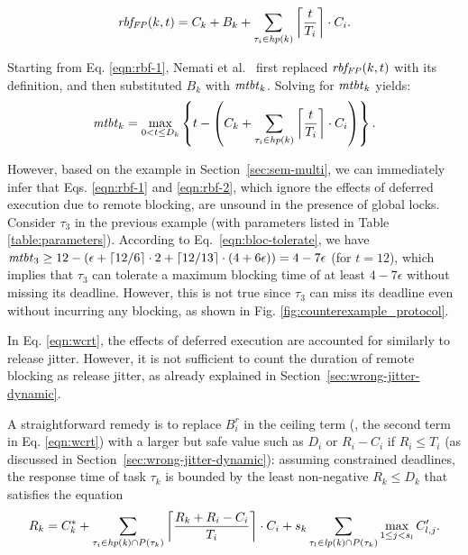 \begin{equation}
\label{eqn:rbf-2}
\mathit{rbf_{FP}}(k,t) = C_k + B_k + \sum_{\tau_i \in \mathit{hp}(k)} \left \lceil \frac{t}{T_i} \right \rceil \cdot C_i.
\end{equation}

Starting from Eq. \eqref{eqn:rbf-1}, Nemati et al.~\cite{NBN:11} first  replaced $\mathit{rbf_{FP}}(k,t)$ with its definition, and then substituted  $B_k$ with $\mathit{mtbt}_k$. Solving for $\mathit{mtbt}_k$ yields:
\begin{equation}
\label{eqn:bloc-tolerate}
\mathit{mtbt}_k = \max_{0<t \leq D_k} \left\{ t - \left( C_k + \sum_{\tau_i \in \mathit{hp}(k)} \left \lceil \frac{t}{T_i} \right \rceil \cdot C_i \right) \right\}.
\end{equation}

However, based on the example in Section~\ref{sec:sem-multi}, we can immediately infer that Eqs. \eqref{eqn:rbf-1} and \eqref{eqn:rbf-2}, which ignore the effects of deferred execution due to remote blocking, are unsound in the presence of global locks. Consider $\tau_3$ in the previous example (with parameters listed in Table \ref{table:parameters}). According to Eq.~\eqref{eqn:bloc-tolerate}, we have $\mathit{mtbt}_3 \geq 12 - (\epsilon + \lceil 12 / 6 \rceil \cdot 2 + \lceil 12 / 13 \rceil \cdot (4+6\epsilon)) = 4-7\epsilon$ (for $t=12$), which implies that $\tau_3$ can tolerate a maximum blocking time of at least $4-7\epsilon$ without missing its deadline. However, this is not true since $\tau_3$ can miss its deadline even without incurring any blocking, as shown in Fig. \ref{fig:counterexample_protocol}. 

\label{sec:safe_bound}

In Eq. \eqref{eqn:wcrt}, the effects of deferred execution  are accounted for similarly to release jitter. However, it is not sufficient to count the duration of remote blocking as release jitter, as already explained in Section~\ref{sec:wrong-jitter-dynamic}.

A straightforward remedy is to replace $B_i^r$ in the ceiling term (\ie, the second term in Eq. \eqref{eqn:wcrt}) with a larger but safe value such as $D_i$  or $R_i - C_i$ if $R_i \leq T_i$ (as discussed in Section~\ref{sec:wrong-jitter-dynamic}): assuming constrained deadlines, the response time of task $\tau_k$ is bounded by the least non-negative $R_k \leq D_k$ that satisfies the equation
\begin{equation}
\label{eqn:wcrt-pfp-fixed}
R_k = C_k^{\ast} + \sum_{\tau_i \in \mathit{hp(k)} \cap P(\tau_k)} \left \lceil \frac{R_k + R_i - C_i}{T_i} \right \rceil \cdot C_i + s_k \sum_{\tau_l \in \mathit{lp(k)} \cap P(\tau_k)} \max_{1 \leq j < s_l} C_{l,j}^{\prime}.
\end{equation}


